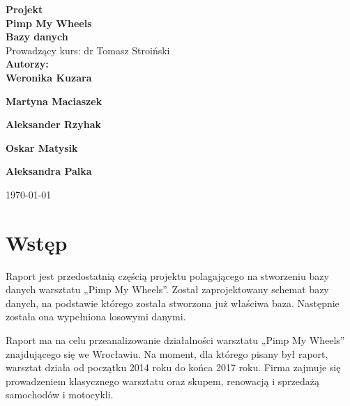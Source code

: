 \documentclass{article}\usepackage[]{graphicx}\usepackage[]{xcolor}
\date{\now}
\begin{document}
\begin{titlepage}
\end{titlepage}
\begin{center}
 {\LARGE\bfseries Projekt\\}
 \vspace{0.5cm}
 {\Huge\bfseries \color{magenta} Pimp My Wheels\\}
 \vspace{0.5cm}
 {\LARGE\bfseries Bazy danych\\}
 {\Large Prowadzący kurs: dr Tomasz Stroiński\\}
 \vspace{1cm}
 {\Large\bfseries Autorzy:\\[4pt]}
 \vspace{1.5cm}
  {\Large\bfseries Weronika Kuzara\\[3pt]}
  \vspace{0.5cm}
 
 {\Large\bfseries Martyna Maciaszek\\[3pt]}
 \vspace{0.5cm}
 
 {\Large\bfseries Aleksander Rzyhak\\[3pt]}
 \vspace{0.5cm}
 
 {\Large\bfseries Oskar Matysik\\[3pt]}
 \vspace{0.5cm}
 
 {\Large\bfseries Aleksandra Palka\\[5pt]}

 \vfill
{\Large \today}
\end{center}
\newpage



\section{Wstęp}
Raport jest przedostatnią częścią projektu polagającego na stworzeniu bazy danych warsztatu „Pimp My Wheels”. Został zaprojektowany schemat bazy danych, na podstawie którego została stworzona już właściwa baza. Następnie została ona wypełniona losowymi danymi.

Raport ma na celu przeanalizowanie działalności warsztatu „Pimp My Wheels” znajdującego się we Wrocławiu. Na moment, dla którego pisany był raport, warsztat działa od początku 2014 roku do końca 2017 roku. Firma zajmuje się prowadzeniem klasycznego warsztatu oraz skupem, renowacją i sprzedażą samochodów i motocykli. 
\end{document}
